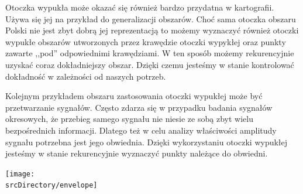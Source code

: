 \documentclass[11pt]{article}
\newcommand*{\srcDirectory}{src}
\newcommand*{\tikzDirectory}{tikz}
\newcommand*{\tikzDirectDirectory}{\srcDirectory/\tikzDirectory}
\begin{document}
    \newpage
    \begin{center}
    \begin{Huge}
        \fontsize{46pt}{46pt}\selectfont{Zastosowania}
    \end{Huge}   
    \end{center}
    \begin{LARGE}        
        Otoczka wypukła może okazać się również bardzo przydatna w kartografii. Używa się jej na przykład do generalizacji obszarów. Choć sama otoczka obszaru Polski nie jest zbyt dobrą jej reprezentacją to możemy wyznaczyć również otoczki wypukłe obszarów utworzonych przez krawędzie otoczki wypykłej oraz punkty zawarte ,,pod'' odpowiednimi krawędziami. W ten sposób możemy rekurencyjnie uzyskać coraz dokładniejszy obszar. Dzięki czemu jesteśmy w stanie  kontrolować dokładność w zależności od naszych potrzeb.
        \vspace*{\fill}
        \begin{center}
            
            \hspace{1cm}
            
            \hspace{1cm}
            
        \end{center} 
    \end{LARGE}  
    
    \newpage
    \begin{center}
    \begin{Huge}
        \fontsize{46pt}{46pt}\selectfont{Zastosowania}
    \end{Huge}   
    \end{center}
    \begin{LARGE} 
        Kolejnym przykładem obszaru zastosowania otoczki wypukłej może być przetwarzanie sygnałów. Często zdarza się w przypadku badania sygnałów okresowych, że przebieg samego sygnału nie niesie ze sobą zbyt wielu bezpośrednich informacji. Dlatego też w celu analizy właściwości   amplitudy sygnału potrzebna jest jego obwiednia. Dzięki wykorzystaniu otoczki wypukłej jesteśmy w stanie rekurencyjnie wyznaczyć punkty należące do obwiedni.        
        \begin{center}
            \texttt{[image: \\srcDirectory/envelope]}
        \end{center} 
    \end{LARGE} 
\end{document}
